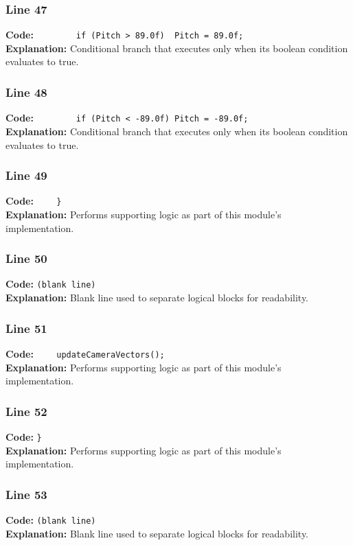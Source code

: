 \documentclass[11pt,a4paper]{article}
\begin{document}
\subsubsection*{Line 47}
\textbf{Code:} \verb|        if (Pitch > 89.0f)  Pitch = 89.0f;|\\
\textbf{Explanation:} Conditional branch that executes only when its boolean condition evaluates to true.

\subsubsection*{Line 48}
\textbf{Code:} \verb|        if (Pitch < -89.0f) Pitch = -89.0f;|\\
\textbf{Explanation:} Conditional branch that executes only when its boolean condition evaluates to true.

\subsubsection*{Line 49}
\textbf{Code:} \verb|    }|\\
\textbf{Explanation:} Performs supporting logic as part of this module's implementation.

\subsubsection*{Line 50}
\textbf{Code:} \texttt{(blank line)}\\
\textbf{Explanation:} Blank line used to separate logical blocks for readability.

\subsubsection*{Line 51}
\textbf{Code:} \verb|    updateCameraVectors();|\\
\textbf{Explanation:} Performs supporting logic as part of this module's implementation.

\subsubsection*{Line 52}
\textbf{Code:} \verb|}|\\
\textbf{Explanation:} Performs supporting logic as part of this module's implementation.

\subsubsection*{Line 53}
\textbf{Code:} \texttt{(blank line)}\\
\textbf{Explanation:} Blank line used to separate logical blocks for readability.
\end{document}
